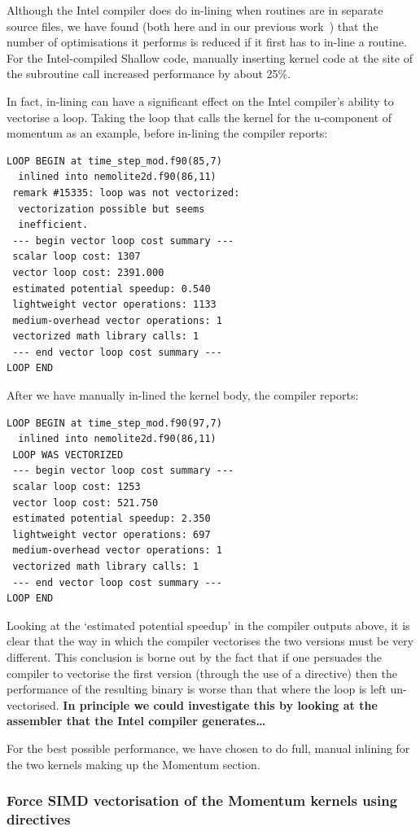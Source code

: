 \documentclass[journal]{IEEEtran}
\begin{document}
Although the Intel compiler does do in-lining when routines are in
separate source files, we have found (both here and in our previous
work~\cite{shallow_psykal}) that the number of optimisations it
performs is reduced if it first has to in-line a routine. For the
Intel-compiled Shallow code, manually inserting kernel code at the
site of the subroutine call increased performance by about 25\%.

In fact, in-lining can have a significant effect on the Intel
compiler's ability to vectorise a loop. Taking the loop that calls the
kernel for the u-component of momentum as an example, before in-lining
the compiler reports:
\begin{verbatim}
LOOP BEGIN at time_step_mod.f90(85,7) 
  inlined into nemolite2d.f90(86,11)
 remark #15335: loop was not vectorized: 
  vectorization possible but seems 
  inefficient. 
 --- begin vector loop cost summary ---
 scalar loop cost: 1307 
 vector loop cost: 2391.000 
 estimated potential speedup: 0.540 
 lightweight vector operations: 1133 
 medium-overhead vector operations: 1 
 vectorized math library calls: 1 
 --- end vector loop cost summary ---
LOOP END
\end{verbatim}
After we have manually in-lined the kernel body, the compiler reports:
\begin{verbatim}
LOOP BEGIN at time_step_mod.f90(97,7) 
  inlined into nemolite2d.f90(86,11)
 LOOP WAS VECTORIZED
 --- begin vector loop cost summary ---
 scalar loop cost: 1253 
 vector loop cost: 521.750 
 estimated potential speedup: 2.350 
 lightweight vector operations: 697 
 medium-overhead vector operations: 1 
 vectorized math library calls: 1 
 --- end vector loop cost summary ---
LOOP END
\end{verbatim}
Looking at the `estimated potential speedup' in the compiler outputs
above, it is clear that the way in which the compiler vectorises the
two versions must be very different. This conclusion is borne out by
the fact that if one persuades the compiler to vectorise the first
version (through the use of a directive) then the performance of the
resulting binary is worse than that where the loop is left
un-vectorised. {\bf In principle we could investigate this by looking
  at the assembler that the Intel compiler generates\ldots}

For the best possible performance, we have chosen to do full, manual
inlining for the two kernels making up the Momentum section.

\subsubsection{Force SIMD vectorisation of the Momentum kernels 
 using directives}
\end{document}
